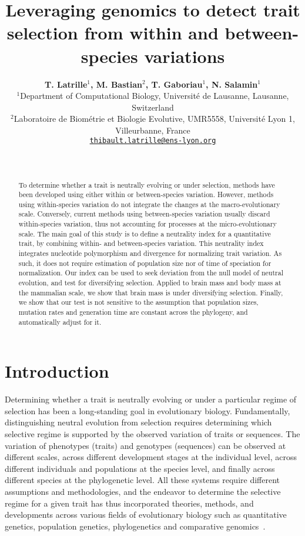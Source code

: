 \documentclass{article}
\title{Leveraging genomics to detect trait selection from within and between-species variations}
\author{
\large
\textbf{T. {Latrille}$^{1}$\orcidlink{0000-0002-9643-4668}, M. {Bastian}$^{2}$, T. {Gaboriau}$^{1}$\orcidlink{0000-0001-7530-2204}, N. {Salamin}$^{1}$\orcidlink{0000-0002-3963-4954}}\\
\normalsize
$^{1}$Department of Computational Biology, Université de Lausanne, Lausanne, Switzerland\\
$^{2}$Laboratoire de Biométrie et Biologie Evolutive, UMR5558, Université Lyon 1, Villeurbanne, France \\
\texttt{\href{mailto:thibault.latrille@ens-lyon.org}{thibault.latrille@ens-lyon.org}} \\
}
\author{~}
\begin{document}
\maketitle

\begin{abstract}
    To determine whether a trait is neutrally evolving or under selection, methods have been developed using either within or between-species variation.
    However, methods using within-species variation do not integrate the changes at the macro-evolutionary scale.
    Conversely, current methods using between-species variation usually discard within-species variation, thus not accounting for processes at the micro-evolutionary scale.
    The main goal of this study is to define a neutrality index for a quantitative trait, by combining within- and between-species variation.
    This neutrality index integrates nucleotide polymorphism and divergence for normalizing trait variation.
    As such, it does not require estimation of population size nor of time of speciation for normalization.
    Our index can be used to seek deviation from the null model of neutral evolution, and test for diversifying selection.
    Applied to brain mass and body mass at the mammalian scale, we show that brain mass is under diversifying selection.
    Finally, we show that our test is not sensitive to the assumption that population sizes, mutation rates and generation time are constant across the phylogeny, and automatically adjust for it.
\end{abstract}


\section*{Introduction}\label{sec:introduction}

Determining whether a trait is neutrally evolving or under a particular regime of selection has been a long-standing goal in evolutionary biology.
Fundamentally, distinguishing neutral evolution from selection requires determining which selective regime is supported by the observed variation of traits or sequences.
The variation of phenotypes (traits) and genotypes (sequences) can be observed at different scales, across different development stages at the individual level, across different individuals and populations at the species level, and finally across different species at the phylogenetic level.
All these systems require different assumptions and methodologies, and the endeavor to determine the selective regime for a given trait has thus incorporated theories, methods, and developments across various fields of evolutionary biology such as quantitative genetics, population genetics, phylogenetics and comparative genomics~\parencite{lynch_genetics_1998, walsh_evolution_2018}.
\end{document}
